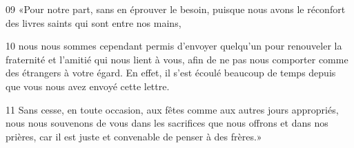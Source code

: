 
09 «Pour notre part, sans en éprouver le besoin, puisque nous avons le réconfort des livres saints qui sont entre nos mains,

10 nous nous sommes cependant permis d’envoyer quelqu’un pour renouveler la fraternité et l’amitié qui nous lient à vous, afin de ne pas nous comporter comme des étrangers à votre égard. En effet, il s’est écoulé beaucoup de temps depuis que vous nous avez envoyé cette lettre.

11 Sans cesse, en toute occasion, aux fêtes comme aux autres jours appropriés, nous nous souvenons de vous dans les sacrifices que nous offrons et dans nos prières, car il est juste et convenable de penser à des frères.»